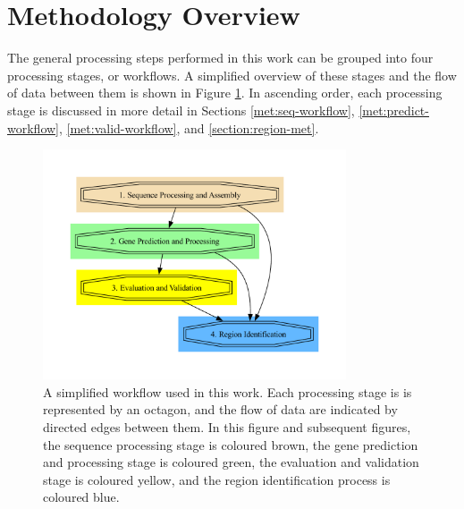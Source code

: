 \section{Methodology Overview}

The general processing steps performed in this work can be grouped
into four processing stages, or workflows. A simplified overview of
these stages and the flow of data between them is shown in Figure
\ref{fig:simple-work}. In ascending order, each processing stage is
discussed in more detail in Sections \ref{met:seq-workflow},
\ref{met:predict-workflow}, \ref{met:valid-workflow}, and
\ref{section:region-met}.

\begin{figure}
  \centering
  \includegraphics[width=0.8\textwidth]{figures/workflow-simple.pdf}
  \caption[Workflow overview]{A simplified workflow used in this work. Each processing
    stage is is represented by an octagon, and the flow of data are
    indicated by directed edges between them. In this figure and
    subsequent figures, the sequence processing stage is coloured
    brown, the gene prediction and processing stage is coloured green,
    the evaluation and validation stage is coloured yellow, and the
    region identification process is coloured blue.}
  \label{fig:simple-work}
\end{figure}


